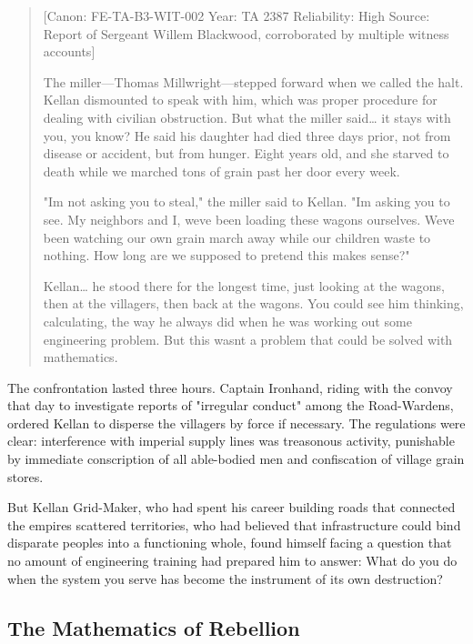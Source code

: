 \begin{quote}
{[}Canon: FE-TA-B3-WIT-002 \textbar{} Year: TA 2387 \textbar{}
Reliability: High \textbar{} Source: Report of Sergeant Willem
Blackwood, corroborated by multiple witness accounts{]}

The miller---Thomas Millwright---stepped forward when we called the
halt. Kellan dismounted to speak with him, which was proper procedure
for dealing with civilian obstruction. But what the miller said\ldots{}
it stays with you, you know? He said his daughter had died three days
prior, not from disease or accident, but from hunger. Eight years old,
and she starved to death while we marched tons of grain past her door
every week.

"I\textquotesingle m not asking you to steal," the miller said to
Kellan. "I\textquotesingle m asking you to see. My neighbors and I,
we\textquotesingle ve been loading these wagons ourselves.
We\textquotesingle ve been watching our own grain march away while our
children waste to nothing. How long are we supposed to pretend this
makes sense?"

Kellan\ldots{} he stood there for the longest time, just looking at the
wagons, then at the villagers, then back at the wagons. You could see
him thinking, calculating, the way he always did when he was working out
some engineering problem. But this wasn\textquotesingle t a problem that
could be solved with mathematics.
\end{quote}

The confrontation lasted three hours. Captain Ironhand, riding with the
convoy that day to investigate reports of "irregular conduct" among the
Road-Wardens, ordered Kellan to disperse the villagers by force if
necessary. The regulations were clear: interference with imperial supply
lines was treasonous activity, punishable by immediate conscription of
all able-bodied men and confiscation of village grain stores.

But Kellan Grid-Maker, who had spent his career building roads that
connected the empire\textquotesingle s scattered territories, who had
believed that infrastructure could bind disparate peoples into a
functioning whole, found himself facing a question that no amount of
engineering training had prepared him to answer: What do you do when the
system you serve has become the instrument of its own destruction?

\subsection{The Mathematics of
Rebellion}\label{the-mathematics-of-rebellion}

